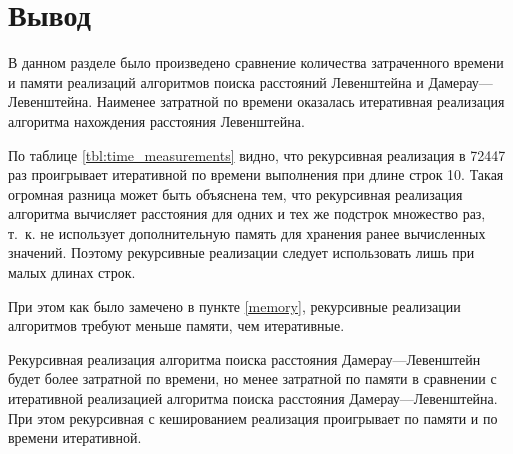 \clearpage


\section*{Вывод}

В данном разделе было произведено сравнение количества затраченного времени и памяти реализаций алгоритмов поиска расстояний Левенштейна и
Дамерау---Левенштейна. Наименее затратной по времени оказалась итеративная реализация алгоритма нахождения расстояния Левенштейна.

По таблице \ref{tbl:time_measurements} видно, что рекурсивная реализация в 72447 раз проигрывает итеративной по времени выполнения при длине строк 10. Такая огромная разница может быть объяснена тем, что рекурсивная реализация алгоритма вычисляет расстояния для одних и тех же подстрок множество раз, т.~к. не использует дополнительную память для хранения ранее вычисленных значений. Поэтому рекурсивные реализации следует использовать лишь при малых длинах строк.

При этом как было замечено в пункте \ref{memory}, рекурсивные реализации алгоритмов требуют меньше памяти, чем итеративные.

Рекурсивная реализация алгоритма поиска расстояния Дамерау---Левенштейн будет более затратной по времени, но менее затратной по памяти в сравнении с итеративной реализацией алгоритма поиска расстояния Дамерау---Левенштейна. При этом рекурсивная с кешированием реализация проигрывает по памяти и по времени итеративной.